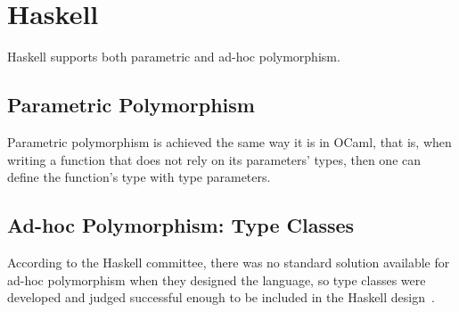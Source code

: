 \section{Haskell}

Haskell supports both parametric and ad-hoc polymorphism.

\subsection{Parametric Polymorphism}

Parametric polymorphism is achieved the same way it is in OCaml, that is, when writing a function that does not rely on its parameters' types, then one can define the function's type with type parameters.

\subsection{Ad-hoc Polymorphism: Type Classes}\label{haskell-type-classes}

According to the Haskell committee, there was no standard solution available for ad-hoc polymorphism when they designed the language, so type classes were developed and judged successful enough to be included in the Haskell design~\cite{type-classes-original}.

